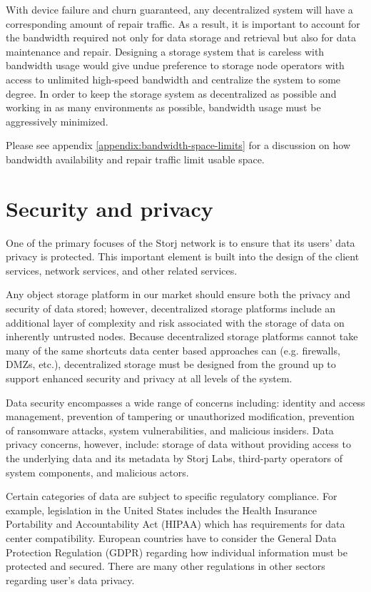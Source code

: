 \documentclass[11pt,fleqn,openany]{book}
\begin{document}
With device failure and churn guaranteed, any decentralized system will have a
corresponding amount of repair traffic. As a result, it is important to account
for the bandwidth required not only for data storage and retrieval but also
for data maintenance and repair. Designing a
storage system that is careless with bandwidth usage would give undue
preference to storage node operators with access to unlimited high-speed
bandwidth and centralize the system to some degree. In order to keep the storage
system as decentralized as possible and working in as many environments
as possible, bandwidth usage must be aggressively minimized.

Please see appendix \ref{appendix:bandwidth-space-limits} for a discussion on how
bandwidth availability and repair traffic limit usable space.

\section{Security and privacy}

One of the primary focuses of the Storj network is to ensure that its users'
data privacy is protected. This important element is
built into the design of the client services, network services, and other related services.

Any object storage platform in our market should ensure both the privacy and
security of data stored; however,
decentralized storage platforms include an additional layer of
complexity and risk associated with the storage of data on inherently
untrusted nodes. Because decentralized storage platforms cannot take many
of the same shortcuts data center based approaches can (e.g. firewalls, DMZs,
etc.), decentralized storage must be designed from the ground up to support
enhanced security and privacy at all levels of the system.

Data security encompasses a wide range of concerns including:
identity and access management, prevention of tampering or unauthorized
modification, prevention of ransomware attacks, system vulnerabilities, and
malicious insiders. Data privacy concerns, however, include: storage of data
without providing access to the underlying data and its metadata by
Storj Labs, third-party operators of system components, and malicious actors.

Certain categories of data are subject to specific regulatory compliance.
For example, legislation in the United States includes
the Health Insurance Portability and
Accountability Act (HIPAA) which has requirements for data center
compatibility. European countries have to consider the General Data Protection
Regulation (GDPR) regarding
how individual information must be protected and secured. There
are many other regulations in other sectors regarding user's data privacy.
\end{document}
